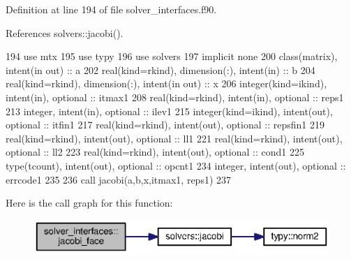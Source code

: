 Definition at line 194 of file solver\+\_\+interfaces.\+f90.



References solvers\+::jacobi().


\begin{DoxyCode}
194         \textcolor{keywordtype}{use }mtx
195         \textcolor{keywordtype}{use }typy
196         \textcolor{keywordtype}{use }solvers
197         \textcolor{keywordtype}{implicit none}
200         \textcolor{keywordtype}{class}(matrix), \textcolor{keywordtype}{intent(in out)} :: a
202         \textcolor{keywordtype}{real(kind=rkind)}, \textcolor{keywordtype}{dimension(:)}, \textcolor{keywordtype}{intent(in)} :: b
204         \textcolor{keywordtype}{real(kind=rkind)}, \textcolor{keywordtype}{dimension(:)}, \textcolor{keywordtype}{intent(in out)} :: x
206         \textcolor{keywordtype}{integer(kind=ikind)}, \textcolor{keywordtype}{intent(in)}, \textcolor{keywordtype}{optional} :: itmax1
208         \textcolor{keywordtype}{real(kind=rkind)}, \textcolor{keywordtype}{intent(in)}, \textcolor{keywordtype}{optional} :: reps1
213         \textcolor{keywordtype}{integer}, \textcolor{keywordtype}{intent(in)}, \textcolor{keywordtype}{optional} :: ilev1
215         \textcolor{keywordtype}{integer(kind=ikind)}, \textcolor{keywordtype}{intent(out)}, \textcolor{keywordtype}{optional} :: itfin1
217         \textcolor{keywordtype}{real(kind=rkind)}, \textcolor{keywordtype}{intent(out)}, \textcolor{keywordtype}{optional} :: repsfin1
219         \textcolor{keywordtype}{real(kind=rkind)}, \textcolor{keywordtype}{intent(out)}, \textcolor{keywordtype}{optional} :: ll1
221         \textcolor{keywordtype}{real(kind=rkind)}, \textcolor{keywordtype}{intent(out)}, \textcolor{keywordtype}{optional} :: ll2
223         \textcolor{keywordtype}{real(kind=rkind)}, \textcolor{keywordtype}{intent(out)}, \textcolor{keywordtype}{optional} :: cond1
225         \textcolor{keywordtype}{type}(tcount), \textcolor{keywordtype}{intent(out)}, \textcolor{keywordtype}{optional} :: opcnt1
234         \textcolor{keywordtype}{integer}, \textcolor{keywordtype}{intent(out)}, \textcolor{keywordtype}{optional} :: errcode1
235         
236         \textcolor{keyword}{call }jacobi(a,b,x,itmax1, reps1)
237 
\end{DoxyCode}


Here is the call graph for this function\+:\nopagebreak
\begin{figure}[H]
\begin{center}
\leavevmode
\includegraphics[width=350pt]{namespacesolver__interfaces_a4ba16c58b7f46a46823245234f5667fb_cgraph}
\end{center}
\end{figure}


